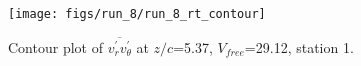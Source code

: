 \begin{figure}[H]
\centering
\texttt{[image: figs/run\_8/run\_8\_rt\_contour]}
\caption{Contour plot of $\overline{v_{r}^{\prime} v_{\theta}^{\prime}}$ at $z/c$=5.37, $V_{free}$=29.12, station 1.}
\label{fig:run_8_rt_contour}
\end{figure}


